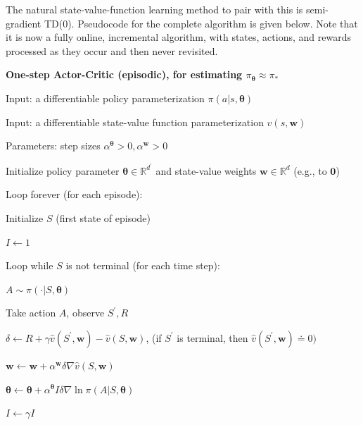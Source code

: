 \documentclass{article}
\begin{document}
The natural state-value-function learning method to pair with this is semi-gradient TD(0). Pseudocode for the complete algorithm is given below. Note that it is now a fully online, incremental algorithm, with states, actions, and rewards processed as they occur and then never revisited.

\textbf{One-step Actor-Critic (episodic), for estimating $\pi_{\pmb{\theta}} \approx \pi_*$}

Input: a differentiable policy parameterization $\pi ( a | s , \pmb { \theta } )$

Input: a differentiable state-value function parameterization $\hat { v } ( s , \mathbf { w } )$

Parameters: step sizes $\alpha ^ { \pmb { \theta } } > 0 ,   \alpha ^ { \mathbf { w } } > 0$

Initialize policy parameter $\pmb { \theta } \in \mathbb { R } ^ { d ^ { \prime } }$ and state-value weights $\mathbf { w } \in \mathbb { R } ^ { d }$ (e.g., to $\mathbf { 0 }$)

Loop forever (for each episode):

\hspace{.5cm} Initialize $S$ (first state of episode)

\hspace{.5cm} $I \gets 1$

\hspace{.5cm} Loop while $S$ is not terminal (for each time step):

\hspace{1cm} $A \sim \pi ( \cdot | S , \pmb { \theta } )$

\hspace{1cm} Take action $A$, observe $S ^ { \prime } , R$

\hspace{1cm} $\delta \gets R + \gamma \hat { v } ( S ^ { \prime } \mathbf { , } \mathbf { w } ) - \hat { v } ( S \mathbf { , } \mathbf { w } )$, (if $S ^ { \prime }$ is terminal, then $\hat { v } ( S ^ { \prime } ,   \mathbf { w } ) \doteq 0 )$

\hspace{1cm} $\mathbf { w } \gets \mathbf { w } + \alpha ^ { \mathbf { w } }   \delta \nabla \hat { v } ( S ,   \mathbf { w } )$

\hspace{1cm} $\pmb { \theta } \leftarrow \pmb { \theta } + \alpha ^ { \pmb { \theta } } I \delta \nabla \ln \pi ( A | S , \pmb { \theta } )$

\hspace{1cm} $I \leftarrow \gamma I$
\end{document}
